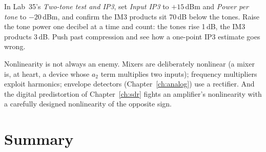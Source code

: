 
\begin{tryit}
In Lab~35's \emph{Two-tone test and IP3}, set \emph{Input IP3} to $+15$\,dBm and \emph{Power per
tone} to $-20$\,dBm, and confirm the IM3 products sit 70\,dB below the tones. Raise the tone power one
decibel at a time and count: the tones rise 1\,dB, the IM3 products 3\,dB. Push past compression and
see how a one-point IP3 estimate goes wrong.
\end{tryit}


Nonlinearity is not always an enemy. Mixers are deliberately nonlinear (a mixer is, at heart, a
device whose $a_2$ term multiplies two inputs); frequency multipliers exploit harmonics; envelope
detectors (Chapter~\ref{ch:analog}) use a rectifier. And the digital predistortion of
Chapter~\ref{ch:sdr} fights an amplifier's nonlinearity with a carefully designed nonlinearity of the
opposite sign.

\section{Summary}
\label{sec:ch02:summary}

